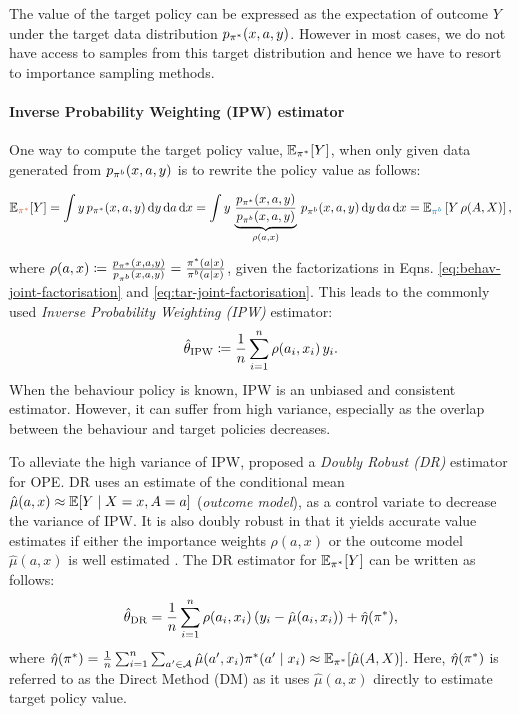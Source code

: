 The value of the target policy can be expressed as the expectation of outcome $Y$ under the target data distribution $p_{\pi^*}(x, a, y)$.
However in most cases, we do not have access to samples from this target distribution and hence we have to resort to importance sampling methods.
\paragraph{Inverse Probability Weighting (IPW) estimator}
One way to compute the target policy value, $\mathbb{E}_{\pi^*}[Y]$, when only given data generated from $p_{\pi^b}(x, a, y)$ is to rewrite the policy value as follows:
\begin{small}
\begin{align*}
    \Etarred[Y] =
    \int y \, \ptar(x, a, y) \,\mathrm{d}y \, \mathrm{d}a\, \mathrm{d}x   =
    \int y \, \underbrace{\frac{\ptar(x, a, y)}{\pbeh(x, a, y)}}_{\rho(a,x)}\, \pbeh(x, a, y) \,\mathrm{d}y \, \mathrm{d}a\, \mathrm{d}x =
    \Ebehblue\left[Y\,\rho(A, X)\right],
\end{align*}
\end{small} 
where 
$
\rho(a, x) \coloneqq \frac{p_{\pi^*}(x, a, y)}{p_{\pi^b}(x, a, y)} = \frac{\pi^*(a|x)}{\pi^b(a|x)}
$, given the factorizations in Eqns. \eqref{eq:behav-joint-factorisation} and \eqref{eq:tar-joint-factorisation}.
This leads to the commonly used \emph{Inverse Probability Weighting (IPW)} \citep{horvitz1952generalization} estimator:
\[
\hat{\theta}_{\textup{IPW}} \coloneqq \frac{1}{n}\sum_{i=1}^n \rho(a_i, x_i)\,y_i.
\]
When the behaviour policy is known, IPW is an unbiased and consistent estimator. However, it can suffer from high variance, especially as the overlap between the behaviour and target policies decreases. 

To alleviate the high variance of IPW, \cite{dudik2014doubly} proposed a \emph{Doubly Robust (DR)} estimator for OPE. 
DR uses an estimate of the conditional mean $\hat{\mu}(a, x) \approx\mathbb{E}[Y\mid X=x, A=a]$ (\emph{outcome model}), as a control variate to decrease the variance of IPW. It is also doubly robust in that it yields accurate value estimates if either the importance weights $\rho(a, x)$ or the outcome model $\hat{\mu}(a, x)$ is well estimated \citep{dudik2014doubly, jiang2016doubly}. 
The DR estimator for $\mathbb{E}_{\pi^*}[Y]$ can be written as follows:
\[
\hat{\theta}_{\textup{DR}} = \frac{1}{n} \sum_{i=1}^n \rho(a_i, x_i)\,(y_i - \hat{\mu}(a_i, x_i)) + \hat{\eta}(\pi^*),
\]
where
$
\hat{\eta}(\pi^*) = \frac{1}{n} \sum_{i=1}^n \sum_{a'\in \mathcal{A}} \hat{\mu}(a', x_i) \pi^*(a'\mid x_i) \approx \mathbb{E}_{\pi^*}[\hat{\mu}(A, X)]$. Here, $\hat{\eta}(\pi^*)$ is referred to as the Direct Method (DM) as it uses $\hat{\mu}(a, x)$ directly to estimate target policy value. 

